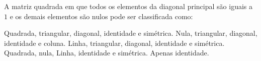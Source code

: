 A matriz quadrada em que todos os elementos da diagonal principal são iguais a $1$ e os demais elementos são nulos pode ser classificada como:

Quadrada, triangular, diagonal, identidade e simétrica.
Nula, triangular, diagonal, identidade e coluna.
Linha, triangular, diagonal, identidade e simétrica.
Quadrada, nula, Linha, identidade e simétrica.
Apenas identidade.


